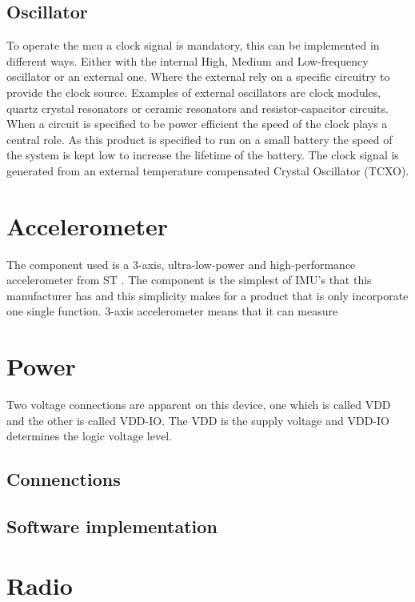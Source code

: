 \subsection{Oscillator}
To operate the \gls{mcu} a clock signal is mandatory, this can be implemented in different ways. Either with the internal High, Medium and Low-frequency oscillator or an external one. Where the external rely on a specific circuitry to provide the clock source. Examples of external oscillators are clock modules, quartz crystal resonators or ceramic resonators and resistor-capacitor circuits. When a circuit is specified to be power efficient the speed of the clock plays a central role. As this product is specified to run on a small battery the speed of the system is kept low to increase the lifetime of the battery. The clock signal is generated from an external temperature compensated Crystal Oscillator (TCXO).



\newpage
\section{Accelerometer} %
The component used is a 3-axis, ultra-low-power and high-performance accelerometer from ST \cite{ST_acc}. The component is the simplest of IMU's that this manufacturer has and this simplicity makes for a product that is only incorporate one single function. 3-axis accelerometer means that it can measure 

\section{Power}
Two voltage connections are apparent on this device, one which is called VDD and the other is called VDD-IO. The VDD is the supply voltage and VDD-IO determines the logic voltage level. 

\subsection{Connenctions}


\subsection{Software implementation}



\newpage
\section{Radio}



